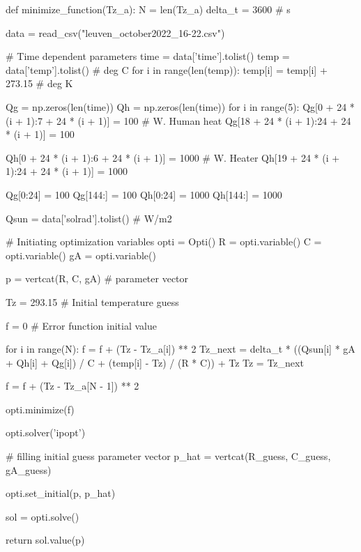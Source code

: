 \begin{python}
def minimize_function(Tz_a):
    N = len(Tz_a)
    delta_t = 3600  # s

    data = read_csv("leuven_october2022_16-22.csv")

    # Time dependent parameters
    time = data['time'].tolist()
    temp = data['temp'].tolist()  # deg C
    for i in range(len(temp)):
        temp[i] = temp[i] + 273.15  # deg K

    Qg = np.zeros(len(time))
    Qh = np.zeros(len(time))
    for i in range(5):
        Qg[0 + 24 * (i + 1):7 + 24 * (i + 1)] = 100  # W. Human heat 
        Qg[18 + 24 * (i + 1):24 + 24 * (i + 1)] = 100 

        Qh[0 + 24 * (i + 1):6 + 24 * (i + 1)] = 1000  # W. Heater
        Qh[19 + 24 * (i + 1):24 + 24 * (i + 1)] = 1000

    Qg[0:24] = 100
    Qg[144:] = 100
    Qh[0:24] = 1000
    Qh[144:] = 1000

    Qsun = data['solrad'].tolist()  # W/m2

    # Initiating optimization variables
    opti = Opti()
    R = opti.variable()
    C = opti.variable()
    gA = opti.variable()

    p = vertcat(R, C, gA)  # parameter vector

    Tz = 293.15  # Initial temperature guess

    f = 0   # Error function initial value

    for i in range(N):
        f = f + (Tz - Tz_a[i]) ** 2
        Tz_next = delta_t * ((Qsun[i] * gA + Qh[i] + Qg[i]) / C + (temp[i] - Tz) / (R * C)) + Tz
        Tz = Tz_next
        
    f = f + (Tz - Tz_a[N - 1]) ** 2

    opti.minimize(f)

    opti.solver('ipopt')

    # filling initial guess parameter vector
    p_hat = vertcat(R_guess, C_guess, gA_guess)

    opti.set_initial(p, p_hat)

    sol = opti.solve()

    return sol.value(p)
\end{python}


